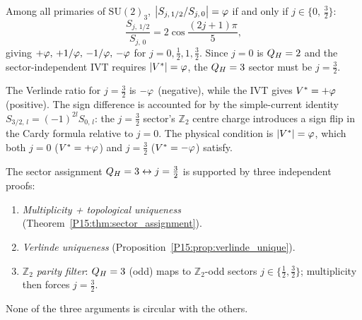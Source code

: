 \begin{proposition}[Verlinde ratio uniquely selects $j=3/2$]
\label{P15:prop:verlinde_unique}
Among all primaries of $\mathrm{SU}(2)_3$,
$\bigl|S_{j,\,1/2}/S_{j,\,0}\bigr|=\varphi$ if and only if
$j\in\{0,\,\frac32\}$:
\begin{equation}
  \frac{S_{j,\,1/2}}{S_{j,\,0}}
  = 2\cos\!\frac{(2j{+}1)\pi}{5},
  \label{P15:eq:ratio_formula}
\end{equation}
giving $+\varphi,\,+1/\varphi,\,-1/\varphi,\,-\varphi$ for $j=0,\tfrac12,1,\tfrac32$.
Since $j=0$ is $Q_H=2$ and the sector-independent IVT requires
$|V^*|=\varphi$, the $Q_H=3$ sector must be $j=\frac32$.
\end{proposition}

\begin{remark}
\label{P15:rem:sign_convention}
The Verlinde ratio for $j=\frac32$ is $-\varphi$ (negative),
while the IVT gives $V^*=+\varphi$ (positive).
The sign difference is accounted for by the simple-current
identity $S_{3/2,\,l}=(-1)^{2l}S_{0,\,l}$: the $j=\frac32$
sector's $\mathbb{Z}_2$ centre charge introduces a sign flip in the Cardy formula relative to $j=0$.
The physical condition is $|V^*|=\varphi$, which both
$j=0$ ($V^*=+\varphi$) and $j=\frac32$ ($V^*=-\varphi$) satisfy.
\end{remark}

\begin{remark}
\label{P15:rem:three_arguments}
The sector assignment $Q_H=3\leftrightarrow j=\frac32$ is supported
by three independent proofs:
\begin{enumerate}[noitemsep,label=\textup{(\roman*)}]
\item \emph{Multiplicity + topological uniqueness}
  (Theorem~\ref{P15:thm:sector_assignment}).
\item \emph{Verlinde uniqueness}
  (Proposition~\ref{P15:prop:verlinde_unique}).
\item \emph{$\mathbb{Z}_2$ parity filter}: $Q_H=3$ (odd)
  maps to $\mathbb{Z}_2$-odd sectors $j\in\{\frac12,\frac32\}$;
  multiplicity then forces $j=\frac32$.
\end{enumerate}
None of the three arguments is circular with the others.
\end{remark}
